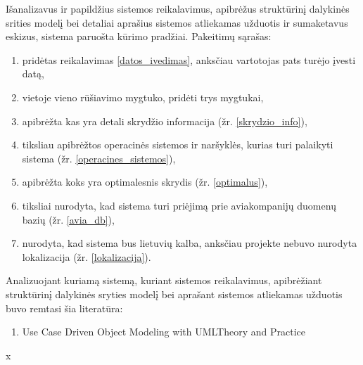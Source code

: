 \documentclass{VUMIFPSkursinis}
\begin{document}
			Išanalizavus ir papildžius sistemos reikalavimus, apibrėžus struktūrinį dalykinės srities modelį bei detaliai aprašius sistemos atliekamas užduotis ir sumaketavus eskizus, sistema paruošta kūrimo pradžiai.
			Pakeitimų sąrašas:
			\begin{enumerate}
				\item pridėtas reikalavimas \ref{datos_ivedimas}, anksčiau vartotojas pats turėjo įvesti datą,
				\item vietoje vieno rūšiavimo mygtuko, pridėti trys mygtukai,
				\item apibrėžta kas yra detali skrydžio informacija (žr. \ref{skrydzio_info}),
				\item tiksliau apibrėžtos operacinės sistemos ir naršyklės, kurias turi palaikyti sistema (žr. \ref{operacines_sistemos}),
				\item apibrėžta koks yra optimalesnis skrydis (žr. \ref{optimalus}),
				\item tiksliai nurodyta, kad sistema turi priėjimą prie aviakompanijų duomenų bazių (žr. \ref{avia_db}),
				\item nurodyta, kad sistema bus lietuvių kalba, anksčiau projekte nebuvo nurodyta lokalizacija (žr. \ref{lokalizacija}).
			\end{enumerate}
        Analizuojant kuriamą sistemą, kuriant sistemos reikalavimus, apibrėžiant struktūrinį dalykinės sryties modelį bei aprašant sistemos atliekamas užduotis buvo remtasi šia literatūra:
            \begin{enumerate}
                \item Use Case Driven Object Modeling with UMLTheory and Practice 
            \end{enumerate}x
      
    
\end{document}
